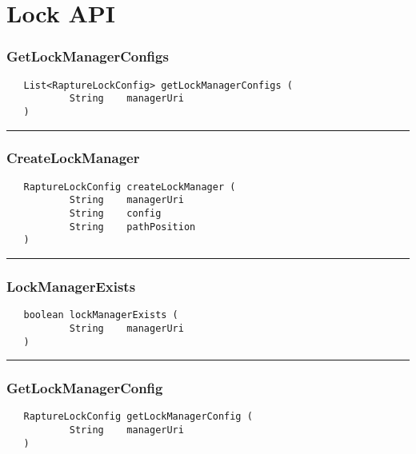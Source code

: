 \chapter{Lock API}

\subsection{GetLockManagerConfigs}
\label{Api:GetLockManagerConfigs}
\begin{verbatim}
   List<RaptureLockConfig> getLockManagerConfigs (
           String    managerUri
   )
\end{verbatim}



\rule{15cm}{2pt}
\subsection{CreateLockManager}
\label{Api:CreateLockManager}
\begin{verbatim}
   RaptureLockConfig createLockManager (
           String    managerUri
           String    config
           String    pathPosition
   )
\end{verbatim}



\rule{15cm}{2pt}
\subsection{LockManagerExists}
\label{Api:LockManagerExists}
\begin{verbatim}
   boolean lockManagerExists (
           String    managerUri
   )
\end{verbatim}



\rule{15cm}{2pt}
\subsection{GetLockManagerConfig}
\label{Api:GetLockManagerConfig}
\begin{verbatim}
   RaptureLockConfig getLockManagerConfig (
           String    managerUri
   )
\end{verbatim}



